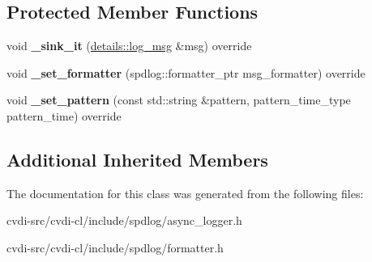 \subsection*{Protected Member Functions}
\begin{DoxyCompactItemize}
\item 
void {\bfseries \+\_\+sink\+\_\+it} (\hyperlink{structspdlog_1_1details_1_1log__msg}{details\+::log\+\_\+msg} \&msg) override\hypertarget{classspdlog_1_1SPDLOG__FINAL_a5388f33b58195e6327006abcdc29d3b7}{}\label{classspdlog_1_1SPDLOG__FINAL_a5388f33b58195e6327006abcdc29d3b7}

\item 
void {\bfseries \+\_\+set\+\_\+formatter} (spdlog\+::formatter\+\_\+ptr msg\+\_\+formatter) override\hypertarget{classspdlog_1_1SPDLOG__FINAL_a108a1495f9a1d7da3e69b5ef0d04051a}{}\label{classspdlog_1_1SPDLOG__FINAL_a108a1495f9a1d7da3e69b5ef0d04051a}

\item 
void {\bfseries \+\_\+set\+\_\+pattern} (const std\+::string \&pattern, pattern\+\_\+time\+\_\+type pattern\+\_\+time) override\hypertarget{classspdlog_1_1SPDLOG__FINAL_a30903420b1196a5a31ea52952e8a3750}{}\label{classspdlog_1_1SPDLOG__FINAL_a30903420b1196a5a31ea52952e8a3750}

\end{DoxyCompactItemize}
\subsection*{Additional Inherited Members}


The documentation for this class was generated from the following files\+:\begin{DoxyCompactItemize}
\item 
cvdi-\/src/cvdi-\/cl/include/spdlog/async\+\_\+logger.\+h\item 
cvdi-\/src/cvdi-\/cl/include/spdlog/formatter.\+h\end{DoxyCompactItemize}
